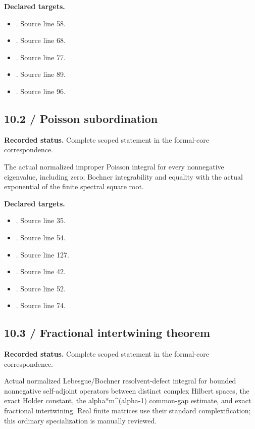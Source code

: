 \textbf{Declared targets.}\begin{itemize}
\item {}. Source line 58.
\item {}. Source line 68.
\item {}. Source line 77.
\item {}. Source line 89.
\item {}. Source line 96.
\end{itemize}
\subsection{10.2 / Poisson subordination}
\label{result:10.2}
\textbf{Recorded status.} Complete scoped statement in the formal-core correspondence.\par
The actual normalized improper Poisson integral for every nonnegative eigenvalue, including zero; Bochner integrability and equality with the actual exponential of the finite spectral square root.

\textbf{Declared targets.}\begin{itemize}
\item {}. Source line 35.
\item {}. Source line 54.
\item {}. Source line 127.
\item {}. Source line 42.
\item {}. Source line 52.
\item {}. Source line 74.
\end{itemize}
\subsection{10.3 / Fractional intertwining theorem}
\label{result:10.3}
\textbf{Recorded status.} Complete scoped statement in the formal-core correspondence.\par
Actual normalized Lebesgue/Bochner resolvent-defect integral for bounded nonnegative self-adjoint operators between distinct complex Hilbert spaces, the exact Holder constant, the alpha*m\textasciicircum{}(alpha-1) common-gap estimate, and exact fractional intertwining. Real finite matrices use their standard complexification; this ordinary specialization is manually reviewed.

